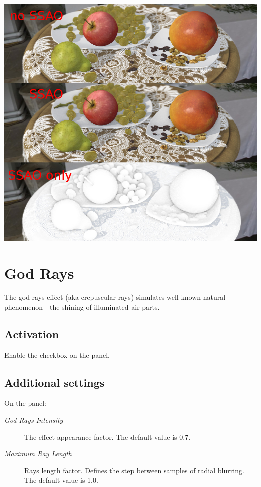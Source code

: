 \documentclass[a4paper,12pt,oneside]{sphinxmanual}
\begin{document}
{\hfill\includegraphics[width=1.000\linewidth]{ssao.jpg}\hfill}

\begin{DUlineblock}{0em}
\item[] 
\end{DUlineblock}


\section{God Rays}
\label{postprocessing_effects:god-rays}\label{postprocessing_effects:id11}\label{postprocessing_effects:index-3}
The god rays effect (aka crepuscular rays) simulates well-known natural phenomenon - the shining of illuminated air parts.


\subsection{Activation}
\label{postprocessing_effects:id12}
Enable the  checkbox on the  panel.


\subsection{Additional settings}
\label{postprocessing_effects:id13}
On the  panel:
\begin{description}
\item[{\emph{God Rays Intensity}}] \leavevmode
The effect appearance factor. The default value is 0.7.

\item[{\emph{Maximum Ray Length}}] \leavevmode
Rays length factor. Defines the step between samples of radial blurring. The default value is 1.0.

\end{description}
\end{document}

